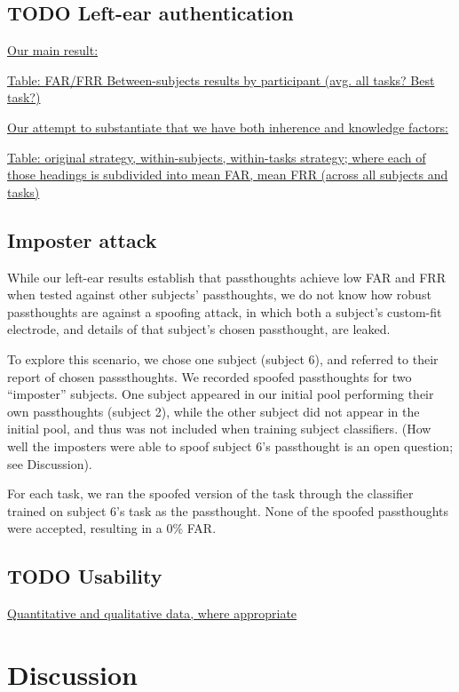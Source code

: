 \documentclass[letterpaper,twocolumn,10pt]{article}
\begin{document}
\subsection{{\bfseries\sffamily TODO} Left-ear authentication}
\label{sec:org82cbcf4}

\underline{Our main result:}

\underline{Table: FAR/FRR Between-subjects results by participant (avg. all tasks? Best task?)}

\underline{Our attempt to substantiate that we have both inherence and knowledge factors:}

\underline{Table: original strategy, within-subjects, within-tasks strategy; where each of those headings is subdivided into mean FAR, mean FRR (across all subjects and tasks)}

\subsection{Imposter attack}

While our left-ear results establish that passthoughts achieve low FAR and FRR when tested against other subjects' passthoughts, we do not know how robust passthoughts are against a spoofing attack, in which both a subject's custom-fit electrode, and details of that subject's chosen passthought, are leaked. 

To explore this scenario, we chose one subject (subject 6), and referred to their report of chosen passsthoughts. We recorded spoofed passthoughts for two ``imposter'' subjects. One subject appeared in our initial pool performing their own passthoughts (subject 2), while the other subject did not appear in the initial pool, and thus was not included when training subject classifiers. (How well the imposters were able to spoof subject 6's passthought is an open question; see Discussion).

For each task, we ran the spoofed version of the task through the classifier trained on subject 6's task as the passthought.
None of the spoofed passthoughts were accepted, resulting in a 0\% FAR.


\subsection{{\bfseries\sffamily TODO} Usability}
\label{sec:org18d5968}

\underline{Quantitative and qualitative data, where appropriate}

\section{Discussion}
\end{document}
